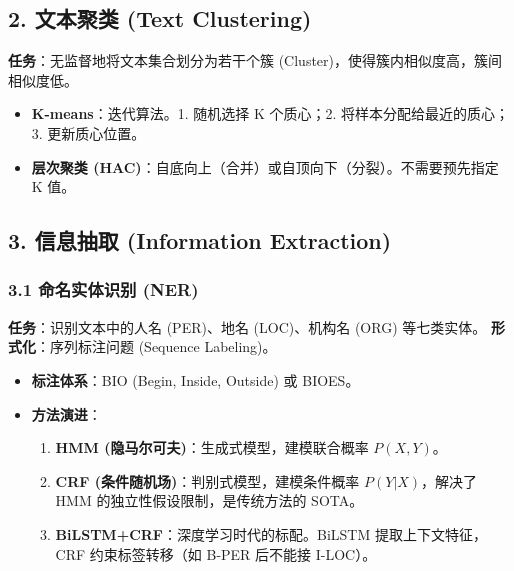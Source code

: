 \documentclass[a4paper, 11pt]{ctexart}
\begin{document}
\subsection{2. 文本聚类 (Text Clustering)}
\textbf{任务}：无监督地将文本集合划分为若干个簇 (Cluster)，使得簇内相似度高，簇间相似度低。
\begin{itemize}
    \item \textbf{K-means}：迭代算法。1. 随机选择 K 个质心；2. 将样本分配给最近的质心；3. 更新质心位置。
    \item \textbf{层次聚类 (HAC)}：自底向上（合并）或自顶向下（分裂）。不需要预先指定 K 值。
\end{itemize}

\subsection{3. 信息抽取 (Information Extraction)}

\subsubsection{3.1 命名实体识别 (NER)}
\textbf{任务}：识别文本中的人名 (PER)、地名 (LOC)、机构名 (ORG) 等七类实体。
\textbf{形式化}：序列标注问题 (Sequence Labeling)。
\begin{itemize}
    \item \textbf{标注体系}：BIO (Begin, Inside, Outside) 或 BIOES。
    \item \textbf{方法演进}：
    \begin{enumerate}
        \item \textbf{HMM (隐马尔可夫)}：生成式模型，建模联合概率 $P(X,Y)$。
        \item \textbf{CRF (条件随机场)}：判别式模型，建模条件概率 $P(Y|X)$，解决了 HMM 的独立性假设限制，是传统方法的 SOTA。
        \item \textbf{BiLSTM+CRF}：深度学习时代的标配。BiLSTM 提取上下文特征，CRF 约束标签转移（如 B-PER 后不能接 I-LOC）。
    \end{enumerate}
\end{itemize}
\end{document}
